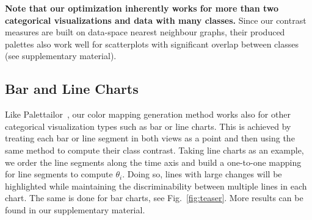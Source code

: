 \textbf{Note that our optimization inherently works for more than two categorical visualizations and data with many classes.} Since our contrast measures are built on data-space nearest neighbour graphs, their produced palettes also work well for scatterplots with significant overlap between classes (see supplementary material).





\subsection{Bar and Line Charts}
\label{subsec:ext}
Like Palettailor~\cite{Lu21}, our color mapping generation method works also for other categorical visualization types such as bar or line charts. This is achieved by treating each bar or line segment in both views as a point and then using the same method to compute their class contrast.
Taking line charts as an example,  we order the line segments along the time axis and build a one-to-one mapping for line segments to compute $\theta_i$.
Doing so, lines with large changes will be highlighted while maintaining the discriminability between multiple lines in each chart. The same is done for bar charts, see Fig.~\ref{fig:teaser}.
More results can be found in our supplementary material.

